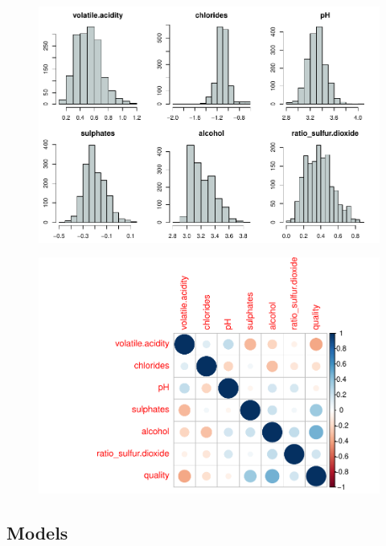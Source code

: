 \documentclass[../main.tex]{subfiles}
\begin{document}
\begin{figure}[H]
\begin{minipage}[]{.6\textwidth}
    \centering
    \includegraphics[scale=0.6]{AppendixFiles/Hist2-1.pdf}
    \label{fig:Hist2}
\end{minipage}
\hspace{-0.5cm}
\begin{minipage}[]{.4\textwidth}
    \centering
    \includegraphics[scale=0.5]{AppendixFiles/corrplot2-1.pdf}
    \label{fig:Cor3}
\end{minipage}
\end{figure}


\newpage
\subsection{Models}
\end{document}
